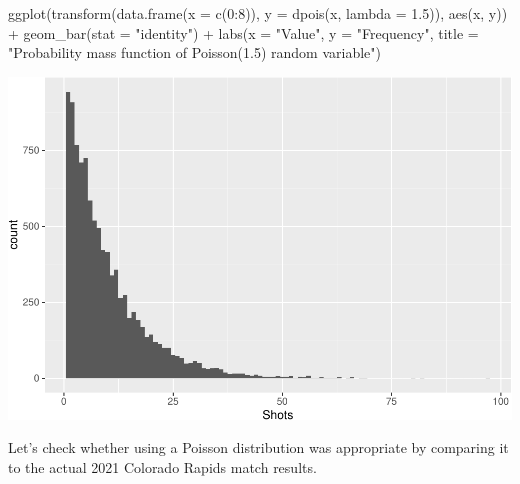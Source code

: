 \documentclass[
  11pt,
]{book}
\newenvironment{Shaded}{\begin{snugshade}}{\end{snugshade}}
\newcommand{\AttributeTok}[1]{\textcolor[rgb]{0.77,0.63,0.00}{#1}}
\newcommand{\DecValTok}[1]{\textcolor[rgb]{0.00,0.00,0.81}{#1}}
\newcommand{\FloatTok}[1]{\textcolor[rgb]{0.00,0.00,0.81}{#1}}
\newcommand{\FunctionTok}[1]{\textcolor[rgb]{0.00,0.00,0.00}{#1}}
\newcommand{\NormalTok}[1]{#1}
\newcommand{\SpecialCharTok}[1]{\textcolor[rgb]{0.00,0.00,0.00}{#1}}
\newcommand{\StringTok}[1]{\textcolor[rgb]{0.31,0.60,0.02}{#1}}
\theoremstyle{definition}
\theoremstyle{definition}
\theoremstyle{definition}
\theoremstyle{definition}
\theoremstyle{remark}
\begin{document}
\begin{Shaded}
\begin{Highlighting}[]
\FunctionTok{ggplot}\NormalTok{(}\FunctionTok{transform}\NormalTok{(}\FunctionTok{data.frame}\NormalTok{(}\AttributeTok{x =} \FunctionTok{c}\NormalTok{(}\DecValTok{0}\SpecialCharTok{:}\DecValTok{8}\NormalTok{)), }\AttributeTok{y =} \FunctionTok{dpois}\NormalTok{(x, }\AttributeTok{lambda =} \FloatTok{1.5}\NormalTok{)), }\FunctionTok{aes}\NormalTok{(x, y)) }\SpecialCharTok{+}
    \FunctionTok{geom\_bar}\NormalTok{(}\AttributeTok{stat =} \StringTok{"identity"}\NormalTok{) }\SpecialCharTok{+} \FunctionTok{labs}\NormalTok{(}\AttributeTok{x =} \StringTok{"Value"}\NormalTok{, }\AttributeTok{y =} \StringTok{"Frequency"}\NormalTok{, }\AttributeTok{title =} \StringTok{"Probability mass function of Poisson(1.5) random variable"}\NormalTok{)}
\end{Highlighting}
\end{Shaded}

\includegraphics{series_files/figure-latex/unnamed-chunk-52-1.pdf}

Let's check whether using a Poisson distribution was appropriate by comparing it to the actual 2021 Colorado Rapids match results.
\end{document}
